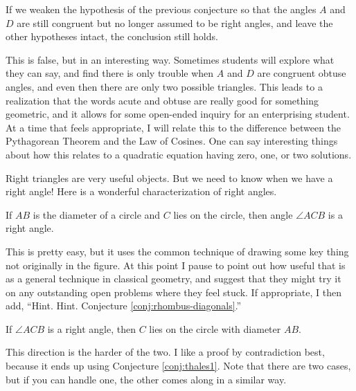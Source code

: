 \begin{conjecture}
\label{conj:ASS}
If we weaken the hypothesis of the previous conjecture so that the angles $A$ and $D$ are still congruent but no longer assumed to be right angles, and leave the other hypotheses intact, the conclusion still holds.
\end{conjecture}

\begin{annotation}
{
\color{blue}
This is false, but in an interesting way. Sometimes students will explore what they can say, and find there is only trouble when $A$ and $D$ are congruent obtuse angles, and even then there are only two possible triangles. This leads to a realization that the words acute and obtuse are really good for something geometric, and it allows for some open-ended inquiry for an enterprising student. At a time that feels appropriate, I will relate this to the difference between the Pythagorean Theorem and the Law of Cosines. One can say interesting things about how this relates to a quadratic equation having zero, one, or two solutions.
}
\end{annotation}

Right triangles are very useful objects. 
But we need to know when we have a right angle! 
Here is a wonderful characterization of right angles.

\begin{conjecture}
\label{conj:thales1}
If $AB$ is the diameter of a circle and $C$ lies on the circle, then angle $\angle ACB$ is a right angle.
\end{conjecture}

\begin{annotation}
{
\color{blue}
This is pretty easy, but it uses the common technique of drawing some key thing not originally in the figure. At this point I pause to point out how useful that is as a general technique in classical geometry, and suggest that they might try it on any outstanding open problems where they feel stuck. If appropriate, I then add, ``Hint. Hint. Conjecture \ref{conj:rhombus-diagonals}.''
}
\end{annotation}

\begin{conjecture}
\label{conj:thales2}
If $\angle ACB$ is a right angle, then $C$ lies on the circle with diameter $AB$.
\end{conjecture}

\begin{annotation}
{
\color{blue}
This direction is the harder of the two. I like a proof by contradiction best, because it ends up using Conjecture \ref{conj:thales1}. Note that there are two cases, but if you can handle one, the other comes along in a similar way.
}
\end{annotation}

